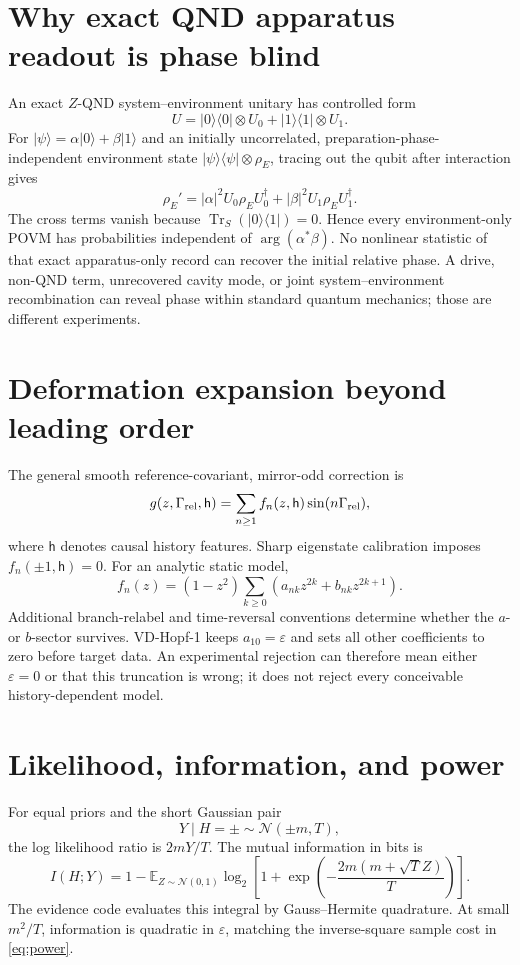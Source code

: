 \documentclass[10pt]{article}
\theoremstyle{definition}
\theoremstyle{remark}
\newcommand{\E}{\mathbb E}
\newcommand{\Tr}{\operatorname{Tr}}
\newcommand{\ket}[1]{\lvert #1\rangle}
\newcommand{\bra}[1]{\langle #1\rvert}
\newcommand{\proj}[1]{\lvert #1\rangle\!\langle #1\rvert}
\begin{document}
\section{Why exact QND apparatus readout is phase blind}
\label{app:phase-blind}

An exact \(Z\)-QND system--environment unitary has controlled form
\[
U
=\proj{0}\otimes U_0+\proj{1}\otimes U_1.
\]
For
\(\ket{\psi}=\alpha\ket0+\beta\ket1\)
and an initially uncorrelated, preparation-phase-independent environment state
\(\proj{\psi}\otimes\rho_E\), tracing out the qubit after interaction gives
\[
\rho_E'
=|\alpha|^2U_0\rho_EU_0^\dagger
+|\beta|^2U_1\rho_EU_1^\dagger.
\]
The cross terms vanish because
\(\Tr_S(\ket0\!\bra1)=0\).
Hence every environment-only POVM has probabilities independent of
\(\arg(\alpha^\ast\beta)\). No nonlinear statistic of that exact apparatus-only record can recover the initial relative phase. A drive, non-QND term, unrecovered cavity mode, or joint system--environment recombination can reveal phase within standard quantum mechanics; those are different experiments.

\section{Deformation expansion beyond leading order}
\label{app:deformation}

The general smooth reference-covariant, mirror-odd correction is
\[
g(z,\Gamma_{\rm rel},\mathsf h)
=
\sum_{n\ge1}f_n(z,\mathsf h)\sin(n\Gamma_{\rm rel}),
\]
where \(\mathsf h\) denotes causal history features. Sharp eigenstate calibration imposes \(f_n(\pm1,\mathsf h)=0\). For an analytic static model,
\[
f_n(z)
=(1-z^2)
\sum_{k\ge0}
\left(a_{nk}z^{2k}+b_{nk}z^{2k+1}\right).
\]
Additional branch-relabel and time-reversal conventions determine whether the \(a\)- or \(b\)-sector survives. VD-Hopf-1 keeps \(a_{10}=\varepsilon\) and sets all other coefficients to zero before target data. An experimental rejection can therefore mean either \(\varepsilon=0\) or that this truncation is wrong; it does not reject every conceivable history-dependent model.

\section{Likelihood, information, and power}
\label{app:statistics}

For equal priors and the short Gaussian pair
\[
Y\mid H=\pm\sim\mathcal N(\pm m,T),
\]
the log likelihood ratio is \(2mY/T\). The mutual information in bits is
\[
I(H;Y)
=1-\E_{Z\sim\mathcal N(0,1)}
\log_2\!\left[
1+\exp\!\left(
-\frac{2m(m+\sqrt T Z)}{T}
\right)
\right].
\]
The evidence code evaluates this integral by Gauss--Hermite quadrature. At small \(m^2/T\), information is quadratic in \(\varepsilon\), matching the inverse-square sample cost in \cref{eq:power}.
\end{document}
